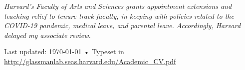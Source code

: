 \documentclass[10pt, a4paper]{article}
\begin{document}





 



\newpage

\textit{Harvard’s Faculty of Arts and Sciences grants appointment extensions and teaching relief to tenure-track faculty, in keeping with policies related to the COVID-19 pandemic, medical leave, and parental leave. Accordingly, Harvard delayed my associate review.}



\vfill{}

\begin{center}
{\scriptsize  Last updated: \today\- •\- 
Typeset in \href{http://nitens.org/taraborelli/cvtex}{
\XeTeX }\\
\href{http://glassmanlab.seas.harvard.edu/Academic_CV.pdf}{http://glassmanlab.seas.harvard.edu/Academic\_CV.pdf}}
\end{center}
\end{document}
